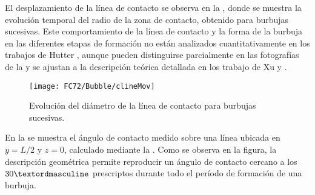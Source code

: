 El desplazamiento de la l\'inea de contacto se observa en la , donde se muestra la evoluci\'on temporal del radio de la zona de contacto, obtenido para burbujas sucesivas. Este comportamiento de la l\'inea de contacto y la forma de la burbuja en las diferentes etapas de formaci\'on no est\'an analizados cuantitativamente en los trabajos de Hutter \cite{hutter_experimental_2009, hutter_experimental_2010}, aunque pueden distinguirse parcialmente en las fotograf\'ias de la  y se ajustan a la descripci\'on te\'orica detallada en los trabajo de Xu \cite{xu_single-bubble_2014} y .

\begin{figure}[ht]
	\centering
	\texttt{[image: FC72/Bubble/clineMov]}
	\caption{Evoluci\'on del di\'ametro de la l\'inea de contacto para burbujas sucesivas.}
	\label{fig:linea_contacto}
\end{figure}

En la  se muestra el \'angulo de contacto medido sobre una l\'inea ubicada en $y=L/2$ y $z=0$, calculado mediante la . Como se observa en la figura, la descripci\'on geom\'etrica permite reproducir un \'angulo de contacto cercano a los $30\textordmasculine$ prescriptos durante todo el per\'iodo de formaci\'on de una burbuja.

